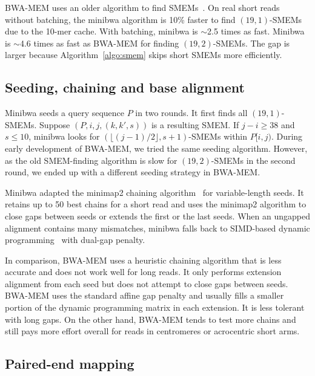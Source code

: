 \documentclass[webpdf,contemporary,large,namedate]{oup-authoring-template}%
\begin{document}
BWA-MEM uses an older algorithm to find SMEMs~\citep{Li:2012fk}.
On real short reads without batching, the minibwa algorithm is 10\% faster to find $(19,1)$-SMEMs due to the 10-mer cache.
With batching, minibwa is $\sim$2.5 times as fast.
Minibwa is $\sim$4.6 times as fast as BWA-MEM for finding $(19,2)$-SMEMs.
The gap is larger because Algorithm~\ref{algo:smem} skips short SMEMs more efficiently.

\subsection{Seeding, chaining and base alignment}\label{sec:align}

Minibwa seeds a query sequence $P$ in two rounds.
It first finds all $(19,1)$-SMEMs.
Suppose $(P,i,j,(k,k',s))$ is a resulting SMEM.
If $j-i\ge38$ and $s\le10$,
minibwa looks for $(\lfloor(j-1)/2\rfloor,s+1)$-SMEMs within $P[i,j)$.
During early development of BWA-MEM, we tried the same seeding algorithm.
However, as the old SMEM-finding algorithm is slow for $(19,2)$-SMEMs in the second round,
we ended up with a different seeding strategy in BWA-MEM.

Minibwa adapted the minimap2 chaining algorithm~\citep{Li:2018ab} for variable-length seeds.
It retains up to 50 best chains for a short read
and uses the minimap2 algorithm to close gaps between seeds or extends the first or the last seeds.
When an ungapped alignment contains many mismatches, minibwa falls back to SIMD-based dynamic programming~\citep{Suzuki:2018aa} with dual-gap penalty.

In comparison, BWA-MEM uses a heuristic chaining algorithm that is less accurate and does not work well for long reads.
It only performs extension alignment from each seed but does not attempt to close gaps between seeds.
BWA-MEM uses the standard affine gap penalty and usually fills a smaller portion of the dynamic programming matrix in each extension.
It is less tolerant with long gaps.
On the other hand, BWA-MEM tends to test more chains and still pays more effort overall for reads in centromeres or acrocentric short arms.

\subsection{Paired-end mapping}\label{sec:pe}
\end{document}
